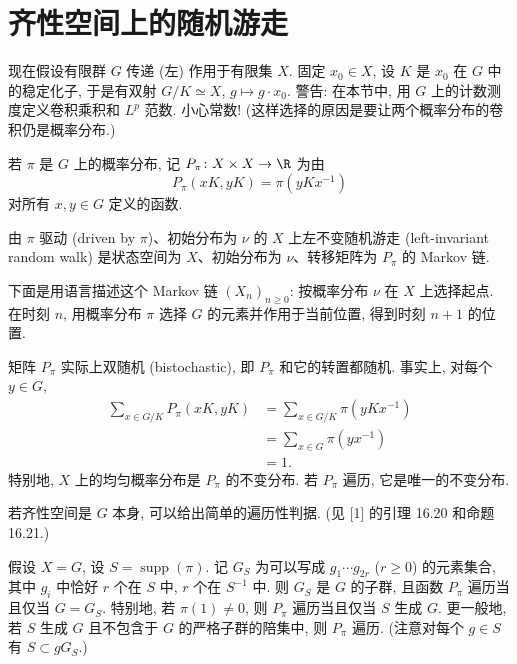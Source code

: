 \section{齐性空间上的随机游走}
现在假设有限群 $G$ 传递 (左) 作用于有限集 $X$. 固定 $x_0 \in X$, 设 $K$ 是 $x_0$ 在 $G$ 中的稳定化子, 于是有双射 $G/K \simeq X$, $g \longmapsto g \cdot x_0$.
警告: 在本节中, 用 $G$ 上的计数测度定义卷积乘积和 $L^p$ 范数. 小心常数! (这样选择的原因是要让两个概率分布的卷积仍是概率分布.)

\begin{definition}[转移概率 $P_{\pi}$]
\label{def:VI.4.1}
若 $\pi$ 是 $G$ 上的概率分布, 记 $P_{\pi} \colon X \times X \to \R$ 为由
\[
P_{\pi}(xK, yK) = \pi(yKx^{-1})
\]
对所有 $x, y \in G$ 定义的函数.
\end{definition}

\begin{definition}[左不变随机游走]
\label{def:VI.4.2}
由 $\pi$ 驱动 (driven by $\pi$)、初始分布为 $\nu$ 的 $X$ 上左不变随机游走 (left-invariant random walk) 是状态空间为 $X$、初始分布为 $\nu$、转移矩阵为 $P_{\pi}$ 的 Markov 链.
\end{definition}

下面是用语言描述这个 Markov 链 $(X_n)_{n \geq 0}$: 按概率分布 $\nu$ 在 $X$ 上选择起点. 在时刻 $n$, 用概率分布 $\pi$ 选择 $G$ 的元素并作用于当前位置, 得到时刻 $n+1$ 的位置.

\begin{remark}[$P_{\pi}$ 双随机]
\label{rem:VI.4.3}
矩阵 $P_{\pi}$ 实际上双随机 (bistochastic), 即 $P_{\pi}$ 和它的转置都随机. 事实上, 对每个 $y \in G$,
\begin{align*}
\sum_{x \in G/K}P_{\pi}(xK, yK) &= \sum_{x \in G/K}\pi(yKx^{-1}) \\
&= \sum_{x \in G}\pi(yx^{-1}) \\
&= 1.
\end{align*}
特别地, $X$ 上的均匀概率分布是 $P_{\pi}$ 的不变分布. 若 $P_{\pi}$ 遍历, 它是唯一的不变分布.
\end{remark}

若齐性空间是 $G$ 本身, 可以给出简单的遍历性判据. (见 {[}1{]} 的引理 16.20 和命题 16.21.)

\begin{proposition}[遍历性判据]
\label{prop:VI.4.4}
假设 $X = G$, 设 $S = \operatorname{supp}(\pi)$. 记 $G_S$ 为可以写成 $g_1\cdots g_{2r}$ ($r \geq 0$) 的元素集合, 其中 $g_i$ 中恰好 $r$ 个在 $S$ 中, $r$ 个在 $S^{-1}$ 中.
则 $G_S$ 是 $G$ 的子群, 且函数 $P_{\pi}$ 遍历当且仅当 $G = G_S$.
特别地, 若 $\pi(1) \neq 0$, 则 $P_{\pi}$ 遍历当且仅当 $S$ 生成 $G$. 更一般地, 若 $S$ 生成 $G$ 且不包含于 $G$ 的严格子群的陪集中, 则 $P_{\pi}$ 遍历. (注意对每个 $g \in S$ 有 $S \subset gG_S$.)
\end{proposition}

